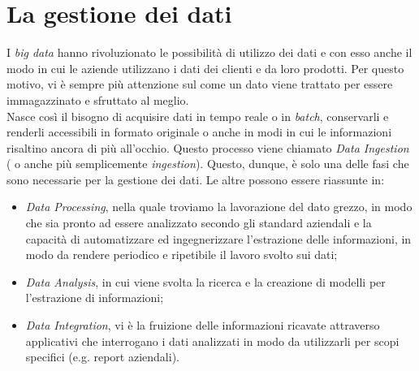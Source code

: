 \section{La gestione dei dati}
I \emph{big data} hanno rivoluzionato le possibilità di utilizzo dei dati e con esso anche il modo in cui le aziende utilizzano i dati dei clienti e da loro prodotti. Per questo motivo, vi è sempre più attenzione sul come un dato viene trattato per essere immagazzinato e sfruttato al meglio.
\\
Nasce così il bisogno di acquisire dati in tempo reale o in \emph{batch}, conservarli e renderli accessibili in formato originale o anche in modi in cui le informazioni risaltino ancora di più all'occhio.
Questo processo viene chiamato \emph{Data Ingestion} ( o anche più semplicemente \emph{ingestion}).
Questo, dunque, è solo una delle fasi che sono necessarie per la gestione dei dati.
Le altre possono essere riassunte in:
\begin{itemize}
	\item \emph{Data Processing}, nella quale troviamo la lavorazione del dato grezzo, in modo che sia pronto ad essere analizzato secondo gli standard aziendali e la capacità di automatizzare ed ingegnerizzare l'estrazione delle informazioni, in modo da rendere periodico e ripetibile il lavoro svolto sui dati;
	\item \emph{Data Analysis}, in cui viene svolta la ricerca e la creazione di modelli per l'estrazione di informazioni;
	\item \emph{Data Integration}, vi è la fruizione delle informazioni ricavate attraverso applicativi che interrogano i dati analizzati in modo da utilizzarli per scopi specifici (e.g. report aziendali).
\end{itemize}

